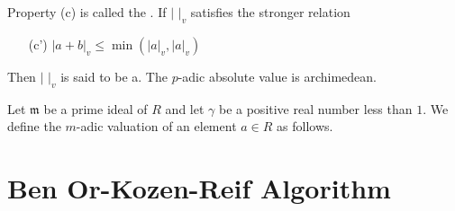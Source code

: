 Property (c) is called the .  If $|\,\,|_v$
satisfies the stronger relation
\begin{itemize}
\item[(c')] $|a + b|_v \le \min(|a|_v, |a|_v)$
\end{itemize}
Then $|\,\,|_v$ is said to be a.  The
$p$-adic absolute value is archimedean.

Let $\mathfrak{m}$ be a prime ideal of $R$ and let $\gamma$ be a positive
real number less than $1$.  We define the $m$-adic valuation of an
element $a \in R$ as follows.  



\section{Ben Or-Kozen-Reif Algorithm}



